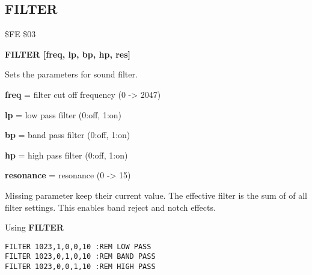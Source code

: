\subsection{FILTER}
\begin{description}[leftmargin=2cm,style=nextline]
\item [Token:] \$FE \$03
\item [Format:] {\bf FILTER [freq, lp, bp, hp, res]}
\item [Usage:] Sets
               the parameters for sound filter.

      {\bf freq} = filter cut off frequency (0 -> 2047)

      {\bf lp} = low pass filter (0:off, 1:on)

      {\bf bp} = band pass filter (0:off, 1:on)

      {\bf hp} = high pass filter (0:off, 1:on)

      {\bf resonance} = resonance (0 -> 15)

\item [Remarks:] Missing parameter keep their current value.
                 The effective filter is the sum of
                 of all filter settings.
                 This enables band reject and notch effects.

\item [Example:]
                Using {\bf FILTER}
\begin{tcolorbox}[colback=black,coltext=white]
\verbatimfont{\codefont}
\begin{verbatim}
FILTER 1023,1,0,0,10 :REM LOW PASS
FILTER 1023,0,1,0,10 :REM BAND PASS
FILTER 1023,0,0,1,10 :REM HIGH PASS
\end{verbatim}
\end{tcolorbox}
\end{description}


\newpage

